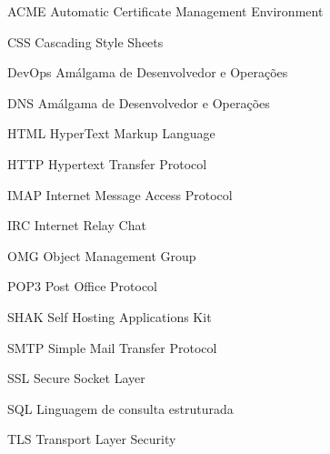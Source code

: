 \begin{siglas}
  \item[ACME] Automatic Certificate Management Environment
  \item[CSS] Cascading Style Sheets
  \item[DevOps] Amálgama de Desenvolvedor e Operações
  \item[DNS] Amálgama de Desenvolvedor e Operações
  \item[HTML] HyperText Markup Language
  \item[HTTP] Hypertext Transfer Protocol
  \item[IMAP] Internet Message Access Protocol
  \item[IRC] Internet Relay Chat
  \item[OMG] Object Management Group
  \item[POP3] Post Office Protocol 
  \item[SHAK] Self Hosting Applications Kit
  \item[SMTP] Simple Mail Transfer Protocol
  \item[SSL] Secure Socket Layer
  \item[SQL] Linguagem de consulta estruturada
  \item[TLS] Transport Layer Security
\end{siglas}
